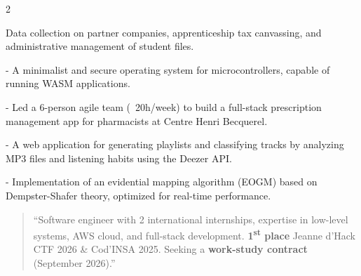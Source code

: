 \documentclass[10pt,a4paper,ragged2e,withhyper]{../AltaCV/altacv}
\begin{document}
\begin{paracol}{2}
	\divider

	Data collection on partner companies, apprenticeship tax canvassing, and administrative management of student files.


	\begin{minipage}[t]{0.49\linewidth}
		{\small {} - A minimalist and secure operating system for microcontrollers, capable of running WASM applications.}

		\divider

		{\small {} - Led a 6-person agile team (~20h/week) to build a full-stack prescription management app for pharmacists at Centre Henri Becquerel.}
	\end{minipage}
	\hfill
	\begin{minipage}[t]{0.49\linewidth}
		{\small {} - A web application for generating playlists and classifying tracks by analyzing MP3 files and listening habits using the Deezer API.}

		\divider

		{\small {} -  Implementation of an evidential mapping algorithm (EOGM) based on Dempster-Shafer theory, optimized for real-time performance.}
	\end{minipage}

	\medskip

	\switchcolumn


	\begin{quote}
		``Software engineer with 2 international internships, expertise in low-level systems, AWS cloud, and full-stack development. \textbf{1\textsuperscript{st} place} Jeanne d'Hack CTF 2026 \& Cod'INSA 2025. Seeking a \textbf{work-study contract} (September 2026).''
	\end{quote}


\end{paracol}
\end{document}
